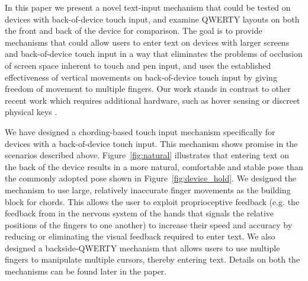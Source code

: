 In this paper we present a novel text-input mechanism that could be
tested on devices with back-of-device touch input, and examine QWERTY
layouts on both the front and back of the device for comparison. The
goal is to provide mechanisms that could allow users to enter text on
devices with larger screens and back-of-device touch input in a way
that eliminates the problems of occlusion of screen space inherent to
touch and pen input, and uses the established effectiveness of
vertical movements on back-of-device touch input 
by giving freedom of movement to multiple fingers.  Our work stands in
contrast to other recent work which requires additional hardware, such
as hover sensing  or discreet physical keys
\cite{RearType}.

We have designed a chording-based touch input mechanism specifically for devices with a back-of-device touch input.  This mechanism shows promise in the scenarios described above.  Figure~\ref{fig:natural} illustrates that entering text on the back of the device results in a more natural, comfortable and stable pose than the commonly adopted pose shown in Figure~\ref{fig:device_hold}.  We designed the mechanism to use large, relatively inaccurate finger movements as the building
block for chords.  This allows the user to exploit proprioceptive feedback (e.g. the feedback from in the nervous system of the hands that signals the relative positions of the fingers to one another) to
increase their speed and accuracy by reducing or eliminating the visual feedback required to enter text. We also designed a backside-QWERTY mechanism that allows users to use multiple fingers to manipulate multiple cursors, thereby entering text. Details on both the mechanisms can be found later in the paper.

